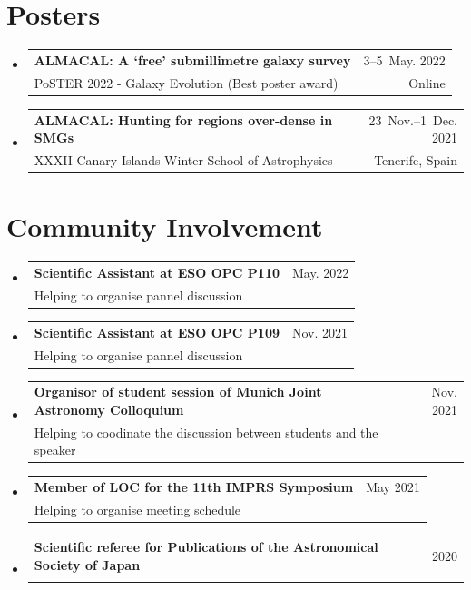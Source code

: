 \documentclass[A4,11pt]{article}
\makeatletter
\newcommand{\CVSubheading}[4]{
  \vspace{-2pt}\item
    \begin{tabular*}{0.97\textwidth}[t]{l@{\extracolsep{\fill}}r}
      \textbf{#1} & #2 \\
      \small#3 & \small #4 \\
    \end{tabular*}\vspace{-7pt}
}
\newcommand{\CVSubHeadingListStart}{\begin{itemize}[leftmargin=0.5cm, label={}]}
\newcommand{\CVSubHeadingListEnd}{\end{itemize}}
\makeatother
\begin{document}

\section{Posters}
  \CVSubHeadingListStart
    \CVSubheading
      {ALMACAL: A `free' submillimetre galaxy survey}{3--5~May. 2022}
      {PoSTER 2022 - Galaxy Evolution (Best poster award)}{Online}
    \CVSubheading
      {ALMACAL: Hunting for regions over-dense in SMGs}{23~Nov.--1~Dec. 2021}
      {XXXII Canary Islands Winter School of Astrophysics}{Tenerife, Spain}
  \CVSubHeadingListEnd

\section{Community Involvement}
  \CVSubHeadingListStart
    \CVSubheading
      {Scientific Assistant at ESO OPC P110}{May. 2022}
      {Helping to organise pannel discussion}{}
    \CVSubheading
      {Scientific Assistant at ESO OPC P109}{Nov. 2021}
      {Helping to organise pannel discussion}{}
    \CVSubheading
      {Organisor of student session of Munich Joint Astronomy Colloquium}{Nov. 2021}
      {Helping to coodinate the discussion between students and the speaker}{}
    \CVSubheading
      {Member of LOC for the 11th IMPRS Symposium}{May 2021}
      {Helping to organise meeting schedule}{}

    \CVSubheading
      {Scientific referee for Publications of the Astronomical Society of Japan}{2020}
      {}{}
  \CVSubHeadingListEnd
\end{document}
